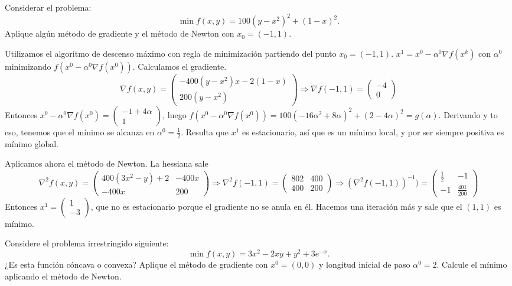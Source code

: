 \documentclass[twoside]{article}
\begin{document}
\newpage

\begin{ejercicio}{4}
Considerar el problema:
$$\min f(x,y)=100(y-x^2)^2+(1-x)^2.$$
Aplique algún método de gradiente y el método de Newton con $x_0=(-1,1)$.
\end{ejercicio}
\begin{solucion}
Utilizamos el algoritmo de descenso máximo con regla de minimización partiendo del punto $x_0=(-1,1)$. $x^1=x^0-\alpha^0\nabla f(x^k)$ con $\alpha^0$ minimizando $f(x^0-\alpha^0\nabla f(x^0))$. Calculamos el gradiente. 
\[
\nabla f(x,y)=\begin{pmatrix}
-400(y-x^2)x-2(1-x)\\
200(y-x^2)
\end{pmatrix}\Rightarrow\nabla f(-1,1)=\begin{pmatrix}
-4\\
0
\end{pmatrix}
\]
Entonces $x^0-\alpha^0\nabla f(x^0)=\begin{pmatrix}
-1+4\alpha\\
1
\end{pmatrix}$, luego $f(x^0-\alpha^0\nabla f(x^0))=100(-16\alpha^2+8\alpha)^2+(2-4\alpha)^2=g(\alpha)$. Derivando y to eso, tenemos que el mínimo se alcanza en $\alpha^0=\frac{1}{2}$. Resulta que $x^1$ es estacionario, así que es un mínimo local, y por ser siempre positiva es mínimo global.

Aplicamos ahora el método de Newton. La hessiana sale
\[
\nabla^2 f(x,y)=\begin{pmatrix}
400(3x^2-y)+2 & -400x\\
-400x & 200
\end{pmatrix}\Rightarrow\nabla^2f(-1,1)=\begin{pmatrix}
802 & 400\\
400 & 200
\end{pmatrix}\Rightarrow(\nabla^2f(-1,1))^{-1})=\begin{pmatrix}
\frac{1}{2} & -1\\
-1 &\frac{401}{200}
\end{pmatrix}
\]
Entonces $x^1=\begin{pmatrix}
1\\
-3
\end{pmatrix}$, que no es estacionario porque el gradiente no se anula en él. Hacemos una iteración más y sale que el $(1,1)$ es mínimo.
\end{solucion}

\newpage
\begin{ejercicio}{5}
Considere el problema irrestringido siguiente:
$$\min f(x,y)=3x^2-2xy+y^2+3e^{-x}.$$
¿Es esta función cóncava o convexa? Aplique el método de gradiente con $x^0=(0,0)$ y longitud inicial de paso $\alpha^0=2$. Calcule el mínimo aplicando el método de Newton. 
\end{ejercicio}
\begin{solucion}
\end{solucion}
\end{document}
